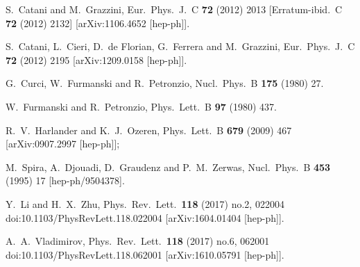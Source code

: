 \documentclass[12pt]{article}
\begin{document}
\begin{thebibliography}{99}
  S.~Catani and M.~Grazzini,
  Eur.\ Phys.\ J.\ C {\bf 72} (2012) 2013
[Erratum-ibid.\ C {\bf 72} (2012) 2132]
[arXiv:1106.4652 [hep-ph]].

  S.~Catani, L.~Cieri, D.~de Florian, G.~Ferrera and M.~Grazzini,
  Eur.\ Phys.\ J.\ C {\bf 72} (2012) 2195
  [arXiv:1209.0158 [hep-ph]].
 
  

  G.~Curci, W.~Furmanski and R.~Petronzio,
  Nucl.\ Phys.\ B {\bf 175} (1980) 27.

  W.~Furmanski and R.~Petronzio,
  Phys.\ Lett.\ B {\bf 97} (1980) 437.


  R.~V.~Harlander and K.~J.~Ozeren,
  Phys.\ Lett.\ B {\bf 679} (2009) 467
  [arXiv:0907.2997 [hep-ph]];
  

  M.~Spira, A.~Djouadi, D.~Graudenz and P.~M.~Zerwas,
  Nucl.\ Phys.\ B {\bf 453} (1995) 17
  [hep-ph/9504378].

  Y.~Li and H.~X.~Zhu,
  Phys.\ Rev.\ Lett.\  {\bf 118} (2017) no.2,  022004
  doi:10.1103/PhysRevLett.118.022004
  [arXiv:1604.01404 [hep-ph]].
  
  A.~A.~Vladimirov,
  Phys.\ Rev.\ Lett.\  {\bf 118} (2017) no.6,  062001
  doi:10.1103/PhysRevLett.118.062001
  [arXiv:1610.05791 [hep-ph]].
  

\end{thebibliography}
\end{document}
